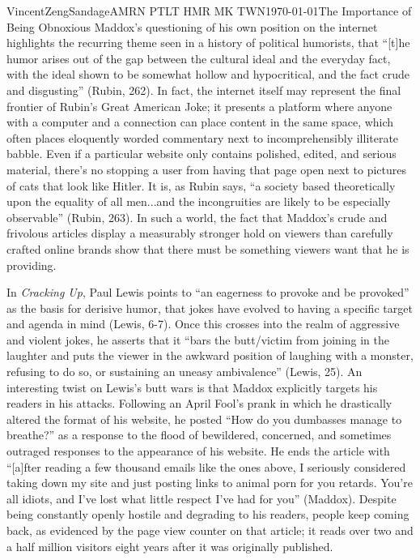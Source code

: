 \documentclass[12 pt]{article}
\begin{document}
\begin{mla}{Vincent}{Zeng}{Sandage}{AMRN PTLT HMR MK TWN}{\today}{The Importance of Being Obnoxious}
	Maddox's questioning of his own position on the internet highlights the recurring theme seen in a history of political humorists, that ``[t]he humor arises out of the gap between the cultural ideal and the everyday fact, with the ideal shown to be somewhat hollow and hypocritical, and the fact crude and disgusting'' (Rubin, 262). In fact, the internet itself may represent the final frontier of Rubin's Great American Joke; it presents a platform where anyone with a computer and a connection can place content in the same space, which often places eloquently worded commentary next to incomprehensibly illiterate babble. Even if a particular website only contains polished, edited, and serious material, there's no stopping a user from having that page open next to pictures of cats that look like Hitler. It is, as Rubin says, ``a society based theoretically upon the equality of all men...and the incongruities are likely to be especially observable'' (Rubin, 263). In such a world, the fact that Maddox's crude and frivolous articles display a measurably stronger hold on viewers than carefully crafted online brands show that there must be something viewers want that he is providing.

	In \textit{Cracking Up}, Paul Lewis points to ``an eagerness to provoke and be provoked'' as the basis for derisive humor, that jokes have evolved to having a specific target and agenda in mind (Lewis, 6-7). Once this crosses into the realm of aggressive and violent jokes, he asserts that it ``bars the butt/victim from joining in the laughter and puts the viewer in the awkward  position of laughing with a monster, refusing to do so, or sustaining an uneasy ambivalence'' (Lewis, 25). An interesting twist on Lewis's butt wars is that Maddox explicitly targets his readers in his attacks. Following an April Fool's prank in which he drastically altered the format of his website, he posted ``How do you dumbasses  manage to breathe?'' as a response to the flood of bewildered, concerned, and sometimes outraged responses to the appearance of his website. He ends the article with ``[a]fter reading a few thousand emails like the ones above, I seriously considered taking down my site and just posting links to animal porn for you retards. You're all idiots, and I've lost what little respect I've had for you'' (Maddox). Despite being constantly openly hostile and degrading to his readers, people keep coming back, as evidenced by the page view counter on that article; it reads over two and a half million visitors eight years after it was originally published.


\end{mla}
\end{document}
